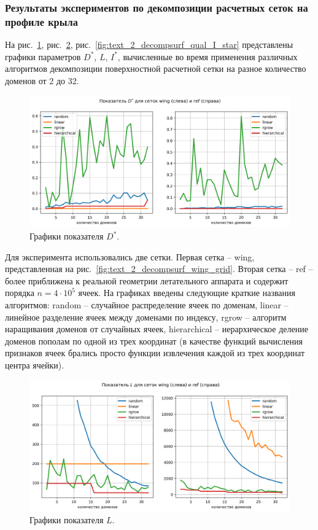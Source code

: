 \subsubsection{Результаты экспериментов по декомпозиции расчетных сеток на профиле крыла}

На рис.~\ref{fig:text_2_decompsurf_qual_D_star}, рис.~\ref{fig:text_2_decompsurf_qual_L}, рис.~\ref{fig:text_2_decompsurf_qual_I_star} представлены графики параметров $D^{*}$, $L$, $I^{*}$, вычисленные во время применения различных алгоритмов декомпозиции поверхностной расчетной сетки на разное количество доменов от 2 до 32.

\begin{figure}[h]
	\centering
	\includegraphics[width=1.0\textwidth]{./pics/text_2_decompsurf/qual_D_star.png}
	\caption{Графики показателя $D^{*}$.}
	\label{fig:text_2_decompsurf_qual_D_star}
\end{figure}

Для эксперимента использовались две сетки.
Первая сетка -- wing, представленная на рис.~\ref{fig:text_2_decompsurf_wing_grid}.
Вторая сетка -- ref -- более приближена к реальной геометрии летательного аппарата и содержит порядка $n = 4 \cdot 10^5$ ячеек.
На графиках введены следующие краткие названия алгоритмов: random -- случайное распределение ячеек по доменам, linear -- линейное разделение ячеек между доменами по индексу, rgrow -- алгоритм наращивания доменов от случайных ячеек, hierarchical -- иерархическое деление доменов пополам по одной из трех координат (в качестве функций вычисления признаков ячеек брались просто функции извлечения каждой из трех координат центра ячейки).

\begin{figure}[H]
	\centering
	\includegraphics[width=1.0\textwidth]{./pics/text_2_decompsurf/qual_L.png}
	\caption{Графики показателя $L$.}
	\label{fig:text_2_decompsurf_qual_L}
\end{figure}

